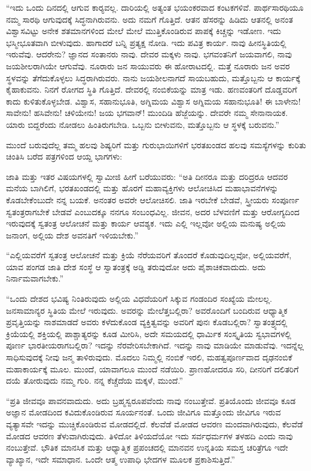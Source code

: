  “ಇದು ಒಂದು ದಿನದಲ್ಲಿ ಆಗುವ ಕಾರ‍್ಯವಲ್ಲ. ದಾರಿಯಲ್ಲಿ ಅತ್ಯಂತ ಭಯಂಕರವಾದ ಕಂಟಕಗಳಿವೆ. ಪಾರ್ಥಸಾರಥಿಯೂ ನಮ್ಮ ಸಾರಥಿ ಆಗುವುದಕ್ಕೆ ಸಿದ್ಧನಾಗಿರುವನು. ಅದು ನಮಗೆ ಗೊತ್ತಿದೆ. ಆತನ ಹೆಸರನ್ನು ಹಿಡಿದು ಆತನಲ್ಲಿ ಅನಂತ ವಿಶ್ವಾಸವಿಟ್ಟು ಅನೇಕ ಶತಮಾನಗಳಿಂದ ಮೇಲೆ ಮೇಲೆ ಮುತ್ತಿಕೊಂಡಿರುವ ಪಾಪಕ್ಕೆ ಕಿಚ್ಚನ್ನು ಇಡೋಣ. ಇದು ಭಸ್ಮೀಭೂತವಾಗಿ ಬೀಳುವುದು. ಹಾಗಾದರೆ ಬನ್ನಿ ಪ್ರತ್ಯಕ್ಷ ನೋಡಿ. ಇದು ಪವಿತ್ರ ಕಾರ್ಯ. ನಾವು ಹೀನಸ್ಥಿತಿಯಲ್ಲಿ ಇರುವೆವು. ಆದರೇನು? ಜ್ಞಾನದ ಸಂತಾನರು ನಾವು. ದೇವರ ಮಕ್ಕಳು ನಾವು. ಭಗವಂತನಿಗೆ ಜಯವಾಗಲಿ, ನಾವು ಜಯಶೀಲರಾಗಿಯೇ ಆಗುವೆವು. ನೂರಾರು ಜನ ಸಾಯುವರು ಈ ಹೋರಾಟದಲ್ಲಿ. ಮತ್ತೆ ನೂರಾರು ಜನ ಅವರ ಸ್ಥಳವನ್ನು ತೆಗೆದುಕೊಳ್ಳಲು ಸಿದ್ಧರಾಗಿರುವರು. ನಾನು ಜಯಶೀಲನಾಗದೆ ಸಾಯಬಹುದು, ಮತ್ತೊಬ್ಬನು ಆ ಕಾರ್ಯಕ್ಕೆ ಕೈಹಾಕುವನು. ನಿನಗೆ ರೋಗದ ಸ್ಥಿತಿ ಗೊತ್ತಿದೆ. ದೇವರಲ್ಲಿ ನಂಬಿಕೆಯನ್ನು ಮಾತ್ರ ಇಡು. ಹಣವಂತರಿಗೆ ದೊಡ್ಡವರಿಗೆ ಕಾದು ಕುಳಿತುಕೊಳ್ಳಬೇಡ. ವಿಶ್ವಾಸ, ಸಹಾನುಭೂತಿ, ಅಗ್ನಿಮಯ ವಿಶ್ವಾಸ ಅಗ್ನಿಮಯ ಸಹಾನುಭೂತಿ! ಈ ಬಾಳೇನು! ಸಾವೇನು! ಹಸಿವೇನು! ಚಳಿಯೇನು! ಜಯ ಭಗವಾನ್! ಮುಂದಿಡಿ ಹೆಜ್ಜೆಯನ್ನು. ದೇವರೇ ನಮ್ಮ ಸೇನಾನಾಯಕ. ಯಾರು ಬಿದ್ದರೆಂದು ನೋಡಲು ಹಿಂತಿರುಗಬೇಡಿ. ಒಬ್ಬನು ಬೀಳುವನು, ಮತ್ತೊಬ್ಬನು ಆ ಸ್ಥಳಕ್ಕೆ ಬರುವನು.” 

 ಮುಂದೆ ಬರುವುದೆಲ್ಲ ತಮ್ಮ ಹಲವು ಶಿಷ್ಯರಿಗೆ ಮತ್ತು ಗುರುಭಾಯಿಗಳಿಗೆ ಭರತಖಂಡದ ಹಲವು ಸಮಸ್ಯೆಗಳನ್ನು ಕುರಿತು ಚಿಂತಿಸಿ ಬರೆದ ಪತ್ರಗಳಿಂದ ಆಯ್ದ ಭಾಗಗಳು: 

 ಜಾತಿ ಮತ್ತು ಇತರ ವಿಷಯಗಳಲ್ಲಿ ಸ್ವಾಮೀಜಿ ಹೀಗೆ ಬರೆಯುವರು: “ಅತಿ ದೀನರೂ ಮತ್ತು ದರಿದ್ರರೂ ಆದವರ ಮನೆಯ ಬಾಗಿಲಿಗೆ, ಭರತಖಂಡದಲ್ಲಿ ಮತ್ತು ಹೊರಗೆ ಮಹಾವ್ಯಕ್ತಿಗಳು ಆಲೋಚಿಸಿದ ಮಹಾಭಾವನೆಗಳನ್ನು ಕೊಡಬೇಕೆಂಬುದೇ ನನ್ನ ಬಯಕೆ. ಅನಂತರ ಅವರೇ ಆಲೋಚಿಸಲಿ. ಜಾತಿ ಇರಬೇಕೆ ಬೇಡವೆ, ಸ್ತ್ರೀಯರು ಸಂಪೂರ್ಣ ಸ್ವತಂತ್ರರಾಗಬೇಕೆ ಬೇಡವೆ ಎಂಬುದಕ್ಕೂ ನನಗೂ ಸಂಬಂಧವಿಲ್ಲ. ಜೀವನ, ಅದರ ಬೆಳವಣಿಗೆ ಮತ್ತು ಆರೋಗ್ಯದಿಂದ ಇರುವುದಕ್ಕೆ ಸ್ವತಂತ್ರ ಆಲೋಚನೆ ಮತ್ತು ಕಾರ್ಯ ಆವಶ್ಯಕ. ಇದು ಎಲ್ಲಿ ಇಲ್ಲವೋ ಅಲ್ಲಿಯ ಮನುಷ್ಯ ಅಲ್ಲಿಯ ಜನಾಂಗ, ಅಲ್ಲಿಯ ದೇಶ ಅವನತಿಗೆ ಇಳಿಯಬೇಕು.” 

 “ಎಲ್ಲಿಯವರೆಗೆ ಸ್ವತಂತ್ರ ಆಲೋಚನೆ ಮತ್ತು ಕ್ರಿಯೆ ನೆರೆಯವರಿಗೆ ತೊಂದರೆ ಕೊಡುವುದಿಲ್ಲವೋ‌, ಅಲ್ಲಿಯವರೆಗೆ, ಯಾವ ಪಂಗಡ ಜಾತಿ ದೇಶ ಸಂಸ್ಥೆ ಆ ಸ್ವಾತಂತ್ರಕ್ಕೆ ಅಡ್ಡಿ ತರುವುದೋ ಅದು ಪೈಶಾಚಿಕವಾದುದು. ಅದು ನಿರ್ನಾಮವಾಗಬೇಕು.” 

 “ಒಂದು ದೇಶದ ಭವಿಷ್ಯ ನಿಂತಿರುವುದು ಅಲ್ಲಿಯ ವಿಧವೆಯರಿಗೆ ಸಿಕ್ಕುವ ಗಂಡಂದಿರ ಸಂಖ್ಯೆಯ ಮೇಲಲ್ಲ. ಜನಸಾಮಾನ್ಯರ ಸ್ಥಿತಿಯ ಮೇಲೆ ಇರುವುದು. ಅವರನ್ನು ಮೇಲೆತ್ತಬಲ್ಲಿರಾ? ಅವರೊಂದಿಗೆ ಬಂದಿರುವ ಆಧ್ಯಾತ್ಮಿಕ ಪ್ರವೃತ್ತಿಯನ್ನು ನಾಶಮಾಡದೆ ಅವರು ಕಳೆದುಕೊಂಡ ವ್ಯಕ್ತಿತ್ವವನ್ನು ಅವರಿಗೆ ಪುನಃ ಕೊಡಬಲ್ಲಿರಾ? ಸ್ವಾತಂತ್ರ್ಯದಲ್ಲಿ ಕ್ರಿಯೆಯಲ್ಲಿ ಶಕ್ತಿಯಲ್ಲಿ ಪಾಶ್ಚಾತ್ಯರನ್ನು ಕೂಡ ಮೀರಿಸಿ, ಅದೇ ಸಮಯದಲ್ಲಿ ಧಾರ್ಮಿಕ ಸಂಸ್ಕೃತಿಯ ಸ್ವಭಾವಗಳಲ್ಲಿ ಪೂರ್ಣ ಭಾರತೀಯರಾಗಬಲ್ಲಿರಾ? ಇದನ್ನು ನೆರವೇರಿಸಬೇಕಾಗಿದೆ. ಇದನ್ನು ನಾವು ಮಾಡಿಯೇ ಮಾಡುವೆವು. ಇದನ್ನೆಲ್ಲ ಸಾಧಿಸುವುದಕ್ಕೆ ನೀವು ಜನ್ಮ ತಾಳಿರುವುದು. ಮೊದಲು ನಿಮ್ಮಲ್ಲಿ ನಂಬಿಕೆ ಇರಲಿ, ಮಹತ್ವಪೂರ್ಣವಾದ ದೃಢನಂಬಿಕೆ ಮಹಾಕಾರ್ಯಕ್ಕೆ ಮೂಲ. ಮುಂದೆ, ಯಾವಾಗಲೂ ಮುಂದೆ ನಡೆಯಿರಿ. ಪ್ರಾಣಹೋದರೂ ಸರಿ, ದೀನರಿಗೆ ದಲಿತರಿಗೆ ದಯೆ ತೋರುವುದು ನಮ್ಮ ಗುರಿ. ನನ್ನ ಕೆಚ್ಚೆದೆಯ ಮಕ್ಕಳೆ, ಮುಂದೆ.” 

 “ಪ್ರತಿ ಜೀವವೂ ಪಾವನವಾದುದು. ಅದು ಬ್ರಹ್ಮಸ್ವರೂಪವೆಂದು ನಾವು ನಂಬುತ್ತೇವೆ. ಪ್ರತಿಯೊಂದು ಜೀವವೂ ಕೂಡ ಅಜ್ಞಾನ ಮೋಡದಿಂದ ಕವಿದುಕೊಂಡಿರುವ ಸೂರ್ಯನಂತೆ. ಒಂದು ಜೀವಿಗೂ ಮತ್ತೊಂದು ಜೀವಿಗೂ ಇರುವ ವ್ಯತ್ಯಾಸವೇ ಇದನ್ನು ಮುಚ್ಚಿಕೊಂಡಿರುವ ಮೋಡದಲ್ಲಿದೆ. ಕೆಲವೆಡೆ ಮೋಡದ ಆವರಣ ಮಂದವಾಗಿರುವುದು, ಕೆಲವೆಡೆ ಮೋಡದ ಆವರಣ ತೆಳುವಾಗಿರುವುದು. ತಿಳಿದೋ ತಿಳಿಯದೆಯೋ ಇದು ಸರ್ವಧರ್ಮಗಳ ತಳಹದಿ ಎಂದು ನಾವು ನಂಬುತ್ತೇವೆ. ಭೌತಿಕ ಮಾನಸಿಕ ಮತ್ತು ಆಧ್ಯಾತ್ಮಿಕ ಪ್ರಪಂಚದಲ್ಲಿ ಮಾನವನ ಉನ್ನತಿಯ ಸಮಸ್ತ ಚರಿತ್ರೆಗೂ ಇದೇ ವ್ಯಾಖ್ಯಾನ, ಇದೇ ಸಮಾಧಾನ. ಒಂದೇ ಆತ್ಮ ಉಪಾಧಿ ಭೇದಗಳ ಮೂಲಕ ಪ್ರಕಾಶಿಸುತ್ತಿದೆ.” 

